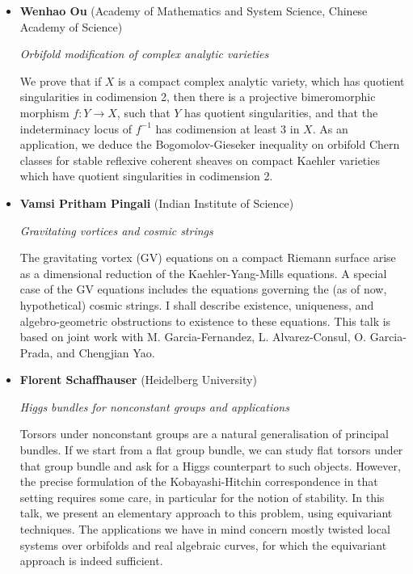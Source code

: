 \documentclass{article}
\begin{document}
\begin{itemize}
\item {\bf Wenhao Ou} (Academy of Mathematics and System Science, Chinese Academy of Science)

{\it Orbifold modification of complex analytic varieties}

We prove that if $X$ is a compact complex analytic variety, which has quotient singularities in codimension 2, then there is a projective bimeromorphic morphism $f\colon Y\to X$, such that $Y$ has quotient singularities, and that the indeterminacy locus of $f^{-1}$ has codimension at least 3 in $X$. As an application, we deduce the Bogomolov-Gieseker inequality on orbifold Chern classes for stable reflexive coherent sheaves on compact Kaehler varieties which have quotient singularities in codimension 2.


\item {\bf Vamsi Pritham Pingali} (Indian Institute of Science)

{\it Gravitating vortices and cosmic strings}

The gravitating vortex (GV) equations on a compact Riemann surface arise as a dimensional reduction of the Kaehler-Yang-Mills equations. A special case of the GV equations includes the equations governing the (as of now, hypothetical) cosmic strings. I shall describe existence, uniqueness, and algebro-geometric obstructions to existence to these equations. This talk is based on joint work with M. Garcia-Fernandez, L. Alvarez-Consul, O. Garcia-Prada, and Chengjian Yao.

\item {\bf Florent Schaffhauser} (Heidelberg University)

{\it Higgs bundles for nonconstant groups and applications}

Torsors under nonconstant groups are a natural generalisation of principal bundles. If we start from a flat group bundle, we can study flat torsors under that group bundle and ask for a Higgs counterpart to such objects. However, the precise formulation of the Kobayashi-Hitchin correspondence in that setting requires some care, in particular for the notion of stability. In this talk, we present an elementary approach to this problem, using equivariant techniques. The applications we have in mind concern mostly twisted local systems over orbifolds and real algebraic curves, for which the equivariant approach is indeed sufficient.




\end{itemize}
\end{document}
